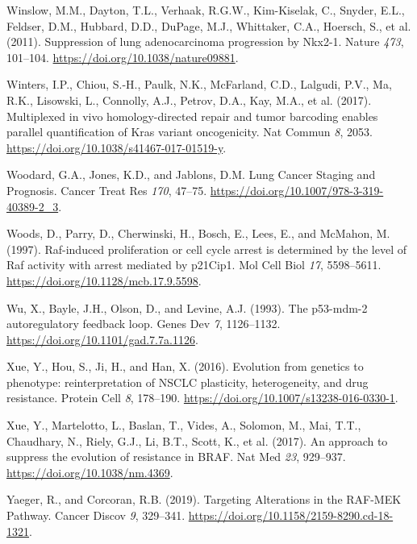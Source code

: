 \begin{CSLReferences}{0}{0}
\leavevmode{}%
Winslow, M.M., Dayton, T.L., Verhaak, R.G.W., Kim-Kiselak, C., Snyder, E.L., Feldser, D.M., Hubbard, D.D., DuPage, M.J., Whittaker, C.A., Hoersch, S., et al. (2011). Suppression of lung adenocarcinoma progression by Nkx2-1. Nature \emph{473}, 101--104. \url{https://doi.org/10.1038/nature09881}.

\leavevmode{}%
Winters, I.P., Chiou, S.-H., Paulk, N.K., McFarland, C.D., Lalgudi, P.V., Ma, R.K., Lisowski, L., Connolly, A.J., Petrov, D.A., Kay, M.A., et al. (2017). Multiplexed in vivo homology-directed repair and tumor barcoding enables parallel quantification of Kras variant oncogenicity. Nat Commun \emph{8}, 2053. \url{https://doi.org/10.1038/s41467-017-01519-y}.

\leavevmode{}%
Woodard, G.A., Jones, K.D., and Jablons, D.M. Lung Cancer Staging and Prognosis. Cancer Treat Res \emph{170}, 47--75. \url{https://doi.org/10.1007/978-3-319-40389-2_3}.

\leavevmode{}%
Woods, D., Parry, D., Cherwinski, H., Bosch, E., Lees, E., and McMahon, M. (1997). Raf-induced proliferation or cell cycle arrest is determined by the level of Raf activity with arrest mediated by p21Cip1. Mol Cell Biol \emph{17}, 5598--5611. \url{https://doi.org/10.1128/mcb.17.9.5598}.

\leavevmode{}%
Wu, X., Bayle, J.H., Olson, D., and Levine, A.J. (1993). The p53-mdm-2 autoregulatory feedback loop. Genes Dev \emph{7}, 1126--1132. \url{https://doi.org/10.1101/gad.7.7a.1126}.

\leavevmode{}%
Xue, Y., Hou, S., Ji, H., and Han, X. (2016). Evolution from genetics to phenotype: reinterpretation of NSCLC plasticity, heterogeneity, and drug resistance. Protein Cell \emph{8}, 178--190. \url{https://doi.org/10.1007/s13238-016-0330-1}.

\leavevmode{}%
Xue, Y., Martelotto, L., Baslan, T., Vides, A., Solomon, M., Mai, T.T., Chaudhary, N., Riely, G.J., Li, B.T., Scott, K., et al. (2017). An approach to suppress the evolution of resistance in BRAF. Nat Med \emph{23}, 929--937. \url{https://doi.org/10.1038/nm.4369}.

\leavevmode{}%
Yaeger, R., and Corcoran, R.B. (2019). Targeting Alterations in the RAF-MEK Pathway. Cancer Discov \emph{9}, 329--341. \url{https://doi.org/10.1158/2159-8290.cd-18-1321}.


\end{CSLReferences}
